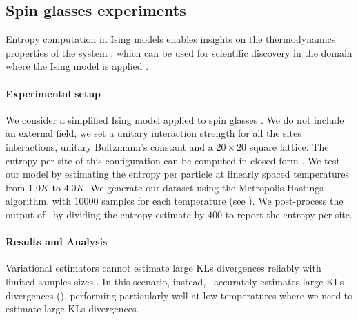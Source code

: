 \subsection{Spin glasses experiments}
Entropy computation in Ising models enables insights on the thermodynamics properties of the system \citep{cincio2007entropy}, which can be used for scientific discovery in the domain where the Ising model is applied \citep{macy2024ising, schneidman2006weak, sherrington1975solvable}. 

\paragraph{Experimental setup} We consider a simplified Ising model applied to spin glasses \citep{sherrington1975solvable}. We do not include an external field, we set a unitary interaction strength for all the sites interactions, unitary Boltzmann's constant and a $20\times20$ square lattice. The entropy per site of this configuration can be computed in closed form \cite{onsager1944crystal}. We test our model by estimating the entropy per particle at linearly spaced temperatures from $1.0K$ to $4.0K$. We generate our dataset using the Metropolis-Hastings algorithm, with $10000$ samples for each temperature (see ). We post-process the output of \infosedd\ by dividing the entropy estimate by $400$ to report the entropy per site.

\paragraph{Results and Analysis} Variational estimators cannot estimate large \glspl{KL} divergences reliably with limited samples sizes \citep{mcallester2020formal,song2019understanding}. In this scenario, instead, \infosedd\ accurately estimates large \glspl{KL} divergences (), performing particularly well at low temperatures where we need to estimate large \glspl{KL} divergences.